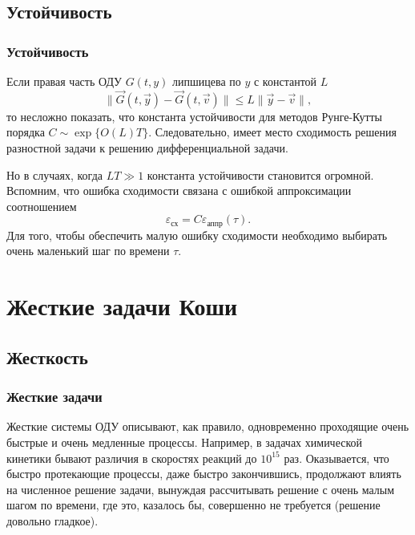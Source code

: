 \documentclass[professionalfonts,compress,unicode,aspectratio=169]{beamer}
\begin{document}
\subsection{Устойчивость}
\begin{frame}\frametitle{Устойчивость}
	Если правая часть ОДУ $G(t,y)$ липшицева по $y$ с константой $L$
	$$\|\vec G(t,\vec y) - \vec G(t,\vec v)\| \leq L \|\vec y-\vec v\|,$$
	то несложно показать, что константа устойчивости для методов Рунге-Кутты порядка
	$C \sim \exp\{O(L)T\}$. Следовательно, имеет место сходимость решения разностной задачи к решению дифференциальной задачи.

	Но в случаях, когда $LT \gg 1$ константа устойчивости становится огромной.
	Вспомним, что ошибка сходимости связана с ошибкой аппроксимации
	соотношением
	$$\varepsilon_\text{сх} = C	\varepsilon_\text{аппр}(\tau).$$
	Для того, чтобы обеспечить малую ошибку сходимости необходимо выбирать очень
	маленький шаг по времени $\tau$.
\end{frame}

\section{Жесткие задачи Коши}
\subsection{Жесткость}
\begin{frame}\frametitle{Жесткие задачи}
	Жесткие системы ОДУ описывают, как правило, одновременно проходящие очень быстрые и очень медленные процессы. 
	Например, в задачах химической кинетики бывают различия в скоростях реакций до $10^{15}$ раз.
	\pause
	Оказывается, что быстро протекающие процессы, даже быстро закончившись, продолжают влиять на численное решение задачи, 
	вынуждая рассчитывать решение с очень малым шагом по времени, где это, казалось бы, совершенно не требуется (решение довольно гладкое).
\end{frame}
\end{document}
